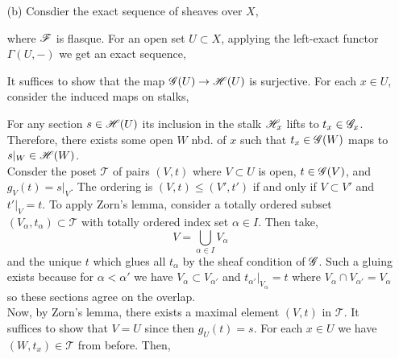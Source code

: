 \documentclass[12pt]{article}
\begin{document}
\begin{enumerate}
\item[(b)] Consdier the exact sequence of sheaves over $X$,
\begin{center}
\end{center}
where $\mathscr{F}$ is flasque. For an open set $U \subset X$, applying the left-exact functor $\Gamma(U, -)$ we get an exact sequence,
\begin{center}
\end{center}
It suffices to show that the map $\mathscr{G}(U) \to \mathscr{H}(U)$ is surjective. For each $x \in U$, consider the induced maps on stalks, 
\begin{center}
\end{center}
For any section $s \in \mathscr{H}(U)$ its inclusion in the stalk $\mathscr{H}_x$ lifts to $t_x \in \mathscr{G}_x$. Therefore, there exists some open $W$ nbd. of $x$ such that $t_x \in \mathscr{G}(W)$ maps to $s|_{W} \in \mathscr{H}(W)$.  
\bigskip\\
Consder the poset $\mathcal{T}$ of pairs $(V, t)$ where $V \subset U$ is open, $t \in \mathscr{G}(V)$, and $g_V(t) = s|_V$. The ordering is $(V, t) \le (V', t')$ if and only if $V \subset V'$ and $t'|_V = t$. To apply Zorn's lemma, consider a totally ordered subset $(V_\alpha, t_\alpha) \subset \mathcal{T}$ with totally ordered index set $\alpha \in I$. Then take,
\[ V = \bigcup_{\alpha \in I} V_\alpha \]
and the unique $t$ which glues all $t_{\alpha}$ by the sheaf condition of $\mathscr{G}$. Such a gluing exists because for $\alpha < \alpha'$ we have $V_\alpha \subset V_{\alpha'}$ and $t_{\alpha'}|_{V_{\alpha}} = t$ where $V_{\alpha} \cap V_{\alpha'} = V_{\alpha}$ so these sections agree on the overlap. 
\bigskip\\
Now, by Zorn's lemma, there exists a maximal element $(V, t)$ in $\mathcal{T}$. It suffices to show that $V = U$ since then $g_U(t) = s$. For each $x \in U$ we have $(W, t_x) \in \mathcal{T}$ from before. Then,
\begin{align*}

\end{align*}
\end{enumerate}
\end{document}
